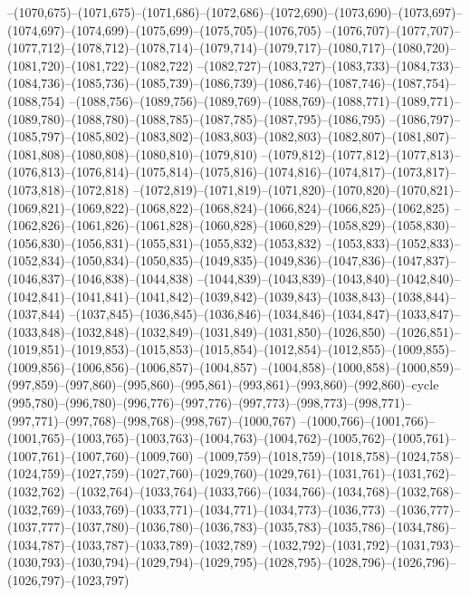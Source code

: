 --(1070,675)--(1071,675)--(1071,686)--(1072,686)--(1072,690)--(1073,690)--(1073,697)--(1074,697)--(1074,699)--(1075,699)--(1075,705)--(1076,705)
--(1076,707)--(1077,707)--(1077,712)--(1078,712)--(1078,714)--(1079,714)--(1079,717)--(1080,717)--(1080,720)--(1081,720)--(1081,722)--(1082,722)
--(1082,727)--(1083,727)--(1083,733)--(1084,733)--(1084,736)--(1085,736)--(1085,739)--(1086,739)--(1086,746)--(1087,746)--(1087,754)--(1088,754)
--(1088,756)--(1089,756)--(1089,769)--(1088,769)--(1088,771)--(1089,771)--(1089,780)--(1088,780)--(1088,785)--(1087,785)--(1087,795)--(1086,795)
--(1086,797)--(1085,797)--(1085,802)--(1083,802)--(1083,803)--(1082,803)--(1082,807)--(1081,807)--(1081,808)--(1080,808)--(1080,810)--(1079,810)
--(1079,812)--(1077,812)--(1077,813)--(1076,813)--(1076,814)--(1075,814)--(1075,816)--(1074,816)--(1074,817)--(1073,817)--(1073,818)--(1072,818)
--(1072,819)--(1071,819)--(1071,820)--(1070,820)--(1070,821)--(1069,821)--(1069,822)--(1068,822)--(1068,824)--(1066,824)--(1066,825)--(1062,825)
--(1062,826)--(1061,826)--(1061,828)--(1060,828)--(1060,829)--(1058,829)--(1058,830)--(1056,830)--(1056,831)--(1055,831)--(1055,832)--(1053,832)
--(1053,833)--(1052,833)--(1052,834)--(1050,834)--(1050,835)--(1049,835)--(1049,836)--(1047,836)--(1047,837)--(1046,837)--(1046,838)--(1044,838)
--(1044,839)--(1043,839)--(1043,840)--(1042,840)--(1042,841)--(1041,841)--(1041,842)--(1039,842)--(1039,843)--(1038,843)--(1038,844)--(1037,844)
--(1037,845)--(1036,845)--(1036,846)--(1034,846)--(1034,847)--(1033,847)--(1033,848)--(1032,848)--(1032,849)--(1031,849)--(1031,850)--(1026,850)
--(1026,851)--(1019,851)--(1019,853)--(1015,853)--(1015,854)--(1012,854)--(1012,855)--(1009,855)--(1009,856)--(1006,856)--(1006,857)--(1004,857)
--(1004,858)--(1000,858)--(1000,859)--(997,859)--(997,860)--(995,860)--(995,861)--(993,861)--(993,860)--(992,860)--cycle
(995,780)--(996,780)--(996,776)--(997,776)--(997,773)--(998,773)--(998,771)--(997,771)--(997,768)--(998,768)--(998,767)--(1000,767)
--(1000,766)--(1001,766)--(1001,765)--(1003,765)--(1003,763)--(1004,763)--(1004,762)--(1005,762)--(1005,761)--(1007,761)--(1007,760)--(1009,760)
--(1009,759)--(1018,759)--(1018,758)--(1024,758)--(1024,759)--(1027,759)--(1027,760)--(1029,760)--(1029,761)--(1031,761)--(1031,762)--(1032,762)
--(1032,764)--(1033,764)--(1033,766)--(1034,766)--(1034,768)--(1032,768)--(1032,769)--(1033,769)--(1033,771)--(1034,771)--(1034,773)--(1036,773)
--(1036,777)--(1037,777)--(1037,780)--(1036,780)--(1036,783)--(1035,783)--(1035,786)--(1034,786)--(1034,787)--(1033,787)--(1033,789)--(1032,789)
--(1032,792)--(1031,792)--(1031,793)--(1030,793)--(1030,794)--(1029,794)--(1029,795)--(1028,795)--(1028,796)--(1026,796)--(1026,797)--(1023,797)
